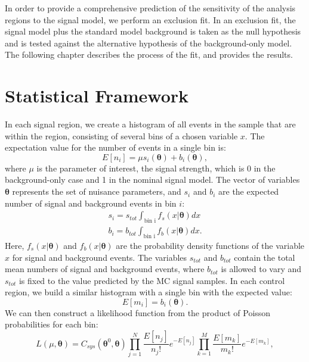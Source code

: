 In order to provide a comprehensive prediction of the sensitivity of the analysis regions to the signal model, we perform an exclusion fit. In an exclusion fit, the signal model plus the standard model background is taken as the null hypothesis and is tested against the alternative hypothesis of the background-only model. The following chapter describes the process of the fit, and provides the results.

\section{Statistical Framework}
\label{section:stats}
In each signal region, we create a histogram of all events in the sample that are within the region, consisting of several bins of a chosen variable $x$. The expectation value for the number of events in a single bin is:
\begin{equation}
E[n_i] = \mu s_i(\boldsymbol{\theta}) + b_i(\boldsymbol{\theta}),
\end{equation}
where $\mu$ is the parameter of interest, the signal strength, which is 0 in the background-only case and 1 in the nominal signal model. The vector of variables $\boldsymbol{\theta}$ represents the set of nuisance parameters, and $s_i$ and $b_i$ are the expected number of signal and background events in bin $i$:
\begin{equation}
\begin{gathered}
s_i = s_{tot} \int_{\text{bin i}} f_s(x|\boldsymbol{\theta}) dx \\
b_i = b_{tot} \int_{\text{bin i}} f_b(x|\boldsymbol{\theta}) dx.
\end{gathered}
\end{equation}
Here, $f_s(x|\boldsymbol{\theta})$ and $f_b(x|\boldsymbol{\theta})$ are the probability density functions of the variable $x$ for signal and background events. The variables $s_{tot}$ and $b_{tot}$ contain the total mean numbers of signal and background events, where $b_{tot}$ is allowed to vary and $s_{tot}$ is fixed to the value predicted by the MC signal samples.
In each control region, we build a similar histogram with a single bin with the expected value:
\begin{equation}
E[m_i] = b_i(\boldsymbol{\theta}).
\end{equation}
We can then construct a likelihood function from the product of Poisson probabilities for each bin:
\begin{equation}
L(\mu,\boldsymbol{\theta}) = C_{sys}(\boldsymbol{\theta}^0,\boldsymbol{\theta})\prod_{j=1}^{N} \frac{E[n_j]}{n_j!}e^{-E[n_j]} \prod_{k=1}^{M} \frac{E[m_k]}{m_k!}e^{-E[m_k]},
\end{equation}
